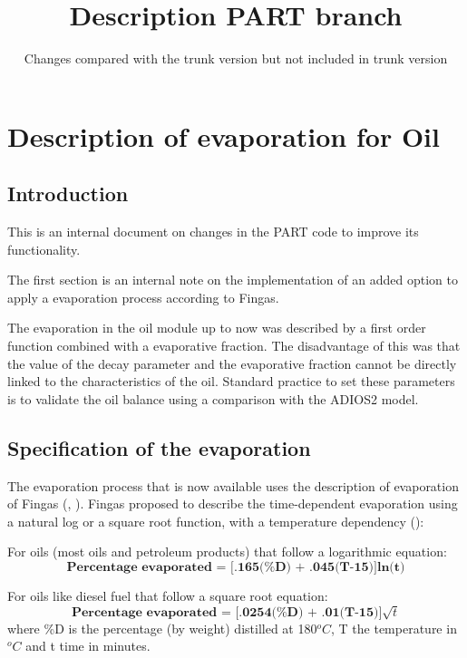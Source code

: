 \documentclass[english]{deltares_manual}
\title{Description PART branch}
\subtitle{Changes compared with the trunk version but not \mbox{included} in trunk version}
\begin{document}
\deltarestitle
\sloppy	

\chapter{Description of evaporation for Oil}

\section{Introduction}
This is an internal document on changes in the PART code to improve its functionality.

The first section is an internal note on the implementation of an added option to apply a evaporation process according to Fingas. 

The evaporation in the oil module up to now was described by a first order function combined with a evaporative fraction.  The disadvantage of this was that the value of the decay parameter and the evaporative fraction cannot be directly linked to the characteristics of the oil. Standard practice to set these parameters is to validate the oil balance using a comparison with the ADIOS2 model. 

\section{Specification of the evaporation}
The evaporation process that is now available uses the description of evaporation of Fingas (\cite{Fingas2004},  \cite{Fingas2013}). Fingas proposed to describe the time-dependent evaporation using a natural log or a square root function, with a temperature dependency (\cite{Fingas2011}):

For oils (most oils and petroleum products) that follow a logarithmic equation:
\begin{equation}\label{evap1}
\textbf{Percentage evaporated = [.165(\%D) + .045(T‐15)]ln(t)}
\end{equation}

For oils like diesel fuel that follow a square root equation:
\begin{equation}\label{evap1}
\textbf{Percentage evaporated = [.0254(\%D) + .01(T‐15)]$\sqrt{t}$}
\end{equation}
where \%D is the percentage (by weight) distilled at 180$^{o}C$, T the temperature in $^{o}C$ and t time in minutes.
\end{document}
